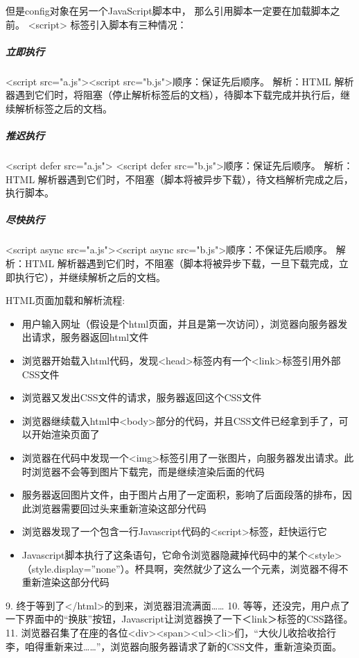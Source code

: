 \documentclass{book}
\begin{document}
但是config对象在另一个JavaScript脚本中，
那么引用脚本一定要在加载脚本之前。
<script> 标签引入脚本有三种情况：

\subparagraph{立即执行}

<script src="a.js"><script src="b.js">顺序：保证先后顺序。
解析：HTML 解析器遇到它们时，将阻塞（停止解析标签后的文档），待脚本下载完成并执行后，继续解析标签之后的文档。

\subparagraph{推迟执行}

<script defer src="a.js">
<script defer src="b.js">顺序：保证先后顺序。
解析：HTML 解析器遇到它们时，不阻塞（脚本将被异步下载），待文档解析完成之后，执行脚本。

\subparagraph{尽快执行}

<script async src="a.js"><script async src="b.js">顺序：不保证先后顺序。
解析：HTML 解析器遇到它们时，不阻塞（脚本将被异步下载，一旦下载完成，立即执行它），并继续解析之后的文档。

HTML页面加载和解析流程:

\begin{itemize}
\item{用户输入网址（假设是个html页面，并且是第一次访问），浏览器向服务器发出请求，服务器返回html文件}
\item{浏览器开始载入html代码，发现<head>标签内有一个<link>标签引用外部CSS文件}
\item{浏览器又发出CSS文件的请求，服务器返回这个CSS文件}
\item{浏览器继续载入html中<body>部分的代码，并且CSS文件已经拿到手了，可以开始渲染页面了}
\item{浏览器在代码中发现一个<img>标签引用了一张图片，向服务器发出请求。此时浏览器不会等到图片下载完，而是继续渲染后面的代码}
\item{服务器返回图片文件，由于图片占用了一定面积，影响了后面段落的排布，因此浏览器需要回过头来重新渲染这部分代码}
\item{浏览器发现了一个包含一行Javascript代码的<script>标签，赶快运行它}
\item{Javascript脚本执行了这条语句，它命令浏览器隐藏掉代码中的某个<style>（style.display=”none”）。杯具啊，突然就少了这么一个元素，浏览器不得不重新渲染这部分代码}
\end{itemize}

9. 终于等到了</html>的到来，浏览器泪流满面……
10. 等等，还没完，用户点了一下界面中的“换肤”按钮，Javascript让浏览器换了一下＜link＞标签的CSS路径。
11. 浏览器召集了在座的各位<div><span><ul><li>们，“大伙儿收拾收拾行李，咱得重新来过……”，浏览器向服务器请求了新的CSS文件，重新渲染页面。
\end{document}
